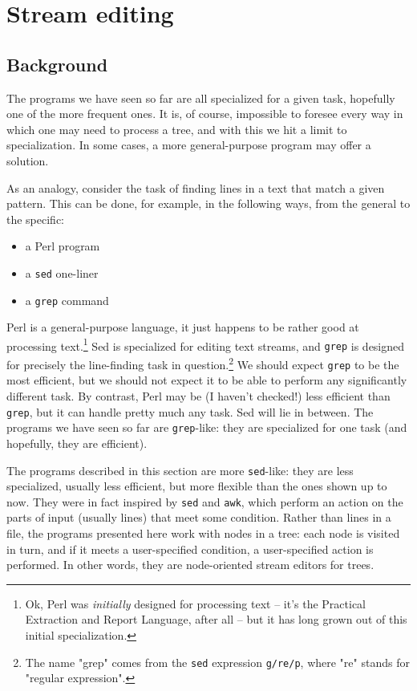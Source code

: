 \section{Stream editing}
\label{sct_ed}

\subsection{Background}

The programs we have seen so far are all specialized for a given task,
hopefully one of the more frequent ones. It is, of course, impossible to
foresee every way in which one may need to process a tree, and with this we hit
a limit to specialization. In some cases, a more general-purpose program may
offer a solution.

As an analogy, consider the task of finding lines in a text that match a
given pattern. This can be done, for example, in the following ways, from the
general to the specific:
\begin{itemize}
	\item a Perl program
	\item a {\tt sed} one-liner
	\item a {\tt grep} command
\end{itemize}
Perl is a general-purpose language, it just happens to be rather good at
processing text.\footnote{Ok, Perl was \emph{initially} designed for processing
text -- it's the Practical Extraction and Report Language, after all -- but it
has long grown out of this initial specialization.} Sed is specialized for
editing text streams, and {\tt grep} is designed for precisely the line-finding
task in question.\footnote{The name "grep" comes from the {\tt sed} expression
{\tt g/re/p}, where "re" stands for "regular expression".} We should expect
{\tt grep} to be the most efficient, but we should not expect it to be able to
perform any significantly different task.  By contrast, Perl may be (I haven't
checked!) less efficient than {\tt grep}, but it can handle pretty much any
task. Sed will lie in between. The \nutils{} programs we have seen so far are
{\tt grep}-like: they are specialized for one task (and hopefully, they are
efficient).

The programs described in this section are more {\tt sed}-like: they are less
specialized, usually less efficient, but more flexible than the ones shown up to
now. They were in fact inspired by \texttt{sed} and \texttt{awk}, which perform
an action on the parts of input (usually lines) that meet some condition. Rather
than lines in a file, the programs presented here work with nodes in a tree:
each node is visited in turn, and if it meets a user-specified condition, a
user-specified action is performed. In other words, they are node-oriented
stream editors for trees.


